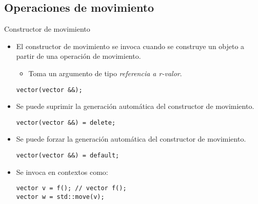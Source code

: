 \subsection{Operaciones de movimiento}

\begin{frame}[fragile]{Constructor de movimiento}
\begin{itemize}
  \item El \alert{constructor de movimiento} se invoca cuando se construye un objeto
        a partir de una operación de movimiento.
    \begin{itemize}
      \item Toma un argumento de tipo \emph{referencia a r-valor}.
    \end{itemize}
\begin{lstlisting}
vector(vector &&);
\end{lstlisting}
  \item Se puede suprimir la generación automática del constructor de movimiento.
\begin{lstlisting}
vector(vector &&) = delete;
\end{lstlisting}
  \item Se puede forzar la generación automática del constructor de movimiento.
\begin{lstlisting}
vector(vector &&) = default;
\end{lstlisting}
  \item Se invoca en contextos como:
\begin{lstlisting}
vector v = f(); // vector f();
vector w = std::move(v);
\end{lstlisting}
\end{itemize}
\end{frame}

